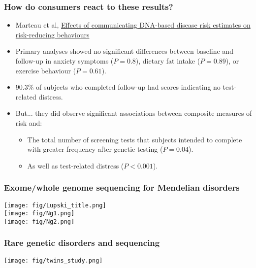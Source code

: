 \documentclass{beamer}
\begin{document}
\begin{frame}
  \frametitle{How do consumers react to these results?}
  \begin{itemize}
  \item Marteau et al, \href{http://onlinelibrary.wiley.com/doi/10.1002/14651858.CD007275.pub2/abstract}{Effects of communicating DNA-based disease risk estimates on risk-reducing behaviours}
  \item Primary analyses showed no significant differences between baseline and follow-up in anxiety symptoms ($P=0.8$), dietary fat intake ($P=0.89$), or exercise behaviour ($P=0.61$). 
  \item 90.3\% of subjects who completed follow-up had scores indicating no test-related distress. 
  \item But... they did observe significant associations between composite measures of risk and:
    \begin{itemize}
    \item The total number of screening tests that subjects intended to complete with greater frequency after genetic testing ($P = 0.04$).
    \item As well as test-related distress ($P < 0.001$).
    \end{itemize}
  \end{itemize}
\end{frame}


\begin{frame}
  \frametitle{Exome/whole genome sequencing for Mendelian disorders}
  \begin{center}
    \texttt{[image: fig/Lupski\_title.png]}\\
    \texttt{[image: fig/Ng1.png]}\\
    \texttt{[image: fig/Ng2.png]}
  \end{center}
\end{frame}


\begin{frame}
  \frametitle{Rare genetic disorders and sequencing}
  \begin{center}
    \texttt{[image: fig/twins\_study.png]}
  \end{center}
\end{frame}
\end{document}
